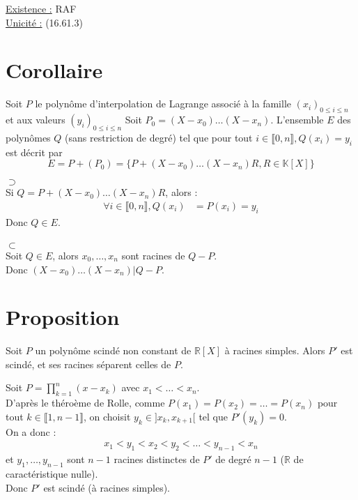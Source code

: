 \documentclass[../main.tex]{subfiles}
\begin{document}
\noindent\underline{Existence :} RAF \\
\noindent\underline{Unicité :} (16.61.3) \\

\section{Corollaire}
\begin{tcolorbox}[title=Corollaire 16.69, title filled=false, colframe=orange, colback=orange!10!white]
    Soit $P$ le polynôme d'interpolation de Lagrange associé à la famille $(x_i)_{0 \leq i \leq n}$ et aux valeurs $(y_i)_{0 \leq i \leq n}$ Soit $P_0 = (X - x_0) \ldots (X - x_n)$. L'ensemble $E$ des polynômes $Q$ (sans restriction de degré) tel que pour tout $i \in \llbracket 0, n \rrbracket, Q(x_i) = y_i$ est décrit par
    $$E = P + (P_0) = \{ P + (X - x_0) \ldots (X - x_n)R, R \in \mathbb{K}[X] \}$$
\end{tcolorbox}

$\boxed{\supset}$ \\
Si $Q = P + (X - x_0) \ldots (X - x_n)R$, alors :
\begin{align*}
    \forall i \in \llbracket 0, n \rrbracket, Q(x_i) &= P(x_i) = y_i
\end{align*}
Donc $Q\in E$. \\ \\

$\boxed{\subset}$ \\
Soit $Q \in E$, alors $x_0, \ldots, x_n$ sont racines de $Q - P$. \\
Donc $(X - x_0) \ldots (X - x_n) | Q - P$. \\

\section{Proposition}
\begin{tcolorbox}[title=Propostion 16.74 (HP), title filled=false, colframe=lightblue, colback=lightblue!10!white]
    Soit $P$ un polynôme scindé non constant de $\mathbb{R}[X]$ à racines simples. Alors $P'$ est scindé, et ses racines séparent celles de $P$. 
\end{tcolorbox}

\noindent Soit $P = \prod\limits_{k=1}^{n} (x - x_k)$ avec $x_1 < \ldots < x_n$. \\
D'après le théroème de Rolle, comme $P(x_1) = P(x_2) = \ldots = P(x_n)$ pour tout $k \in \llbracket 1, n-1 \rrbracket$, on choisit $y_k \in ]x_k, x_{k+1}[$ tel que $P'(y_k) = 0$. \\
On a donc : 
\begin{align*}
    x_1 < y_1 < x_2 < y_2 < \ldots < y_{n-1} < x_n
\end{align*}
et $y_1, \ldots, y_{n-1}$ sont $n-1$ racines distinctes de $P'$ de degré $n-1$ ($\mathbb{R}$ de caractéristique nulle). \\
Donc $P'$ est scindé (à racines simples). 
\end{document}
